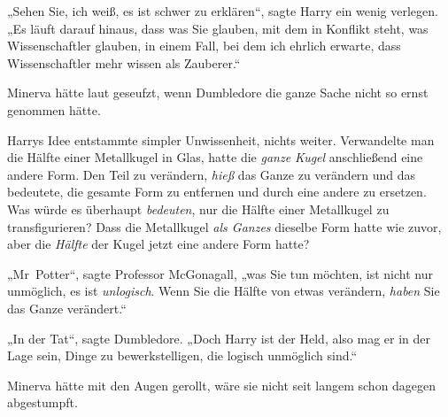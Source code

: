 „Sehen Sie, ich weiß, es ist schwer zu erklären“, sagte Harry ein wenig verlegen.
„Es läuft darauf hinaus, dass was Sie glauben, mit dem in Konflikt steht, was Wissenschaftler glauben, in einem Fall, bei dem ich ehrlich erwarte, dass Wissenschaftler mehr wissen als Zauberer.“

Minerva hätte laut geseufzt, wenn Dumbledore die ganze Sache nicht so ernst genommen hätte.

Harrys Idee entstammte simpler Unwissenheit, nichts weiter. Verwandelte man die Hälfte einer Metallkugel in Glas, hatte die \emph{ganze Kugel} anschließend eine andere Form. Den Teil zu verändern, \emph{hieß} das Ganze zu verändern und das bedeutete, die gesamte Form zu entfernen und durch eine andere zu ersetzen. Was würde es überhaupt \emph{bedeuten}, nur die Hälfte einer Metallkugel zu transfigurieren? Dass die Metallkugel \emph{als Ganzes} dieselbe Form hatte wie zuvor, aber die \emph{Hälfte} der Kugel jetzt eine andere Form hatte?

„Mr~Potter“, sagte Professor McGonagall, „was Sie tun möchten, ist nicht nur unmöglich, es ist \emph{unlogisch}. Wenn Sie die Hälfte von etwas verändern, \emph{haben} Sie das Ganze verändert.“

„In der Tat“, sagte Dumbledore.
„Doch Harry ist der Held, also mag er in der Lage sein, Dinge zu bewerkstelligen, die logisch unmöglich sind.“

Minerva hätte mit den Augen gerollt, wäre sie nicht seit langem schon dagegen abgestumpft.

